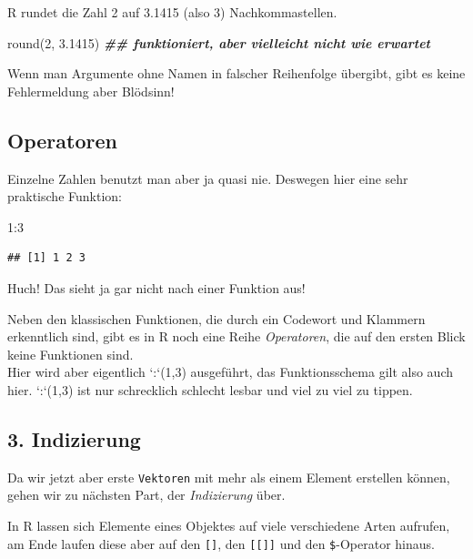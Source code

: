\documentclass[
]{book}
\newenvironment{Shaded}{\begin{snugshade}}{\end{snugshade}}
\newcommand{\DecValTok}[1]{\textcolor[rgb]{0.00,0.00,0.81}{#1}}
\newcommand{\DocumentationTok}[1]{\textcolor[rgb]{0.56,0.35,0.01}{\textbf{\textit{#1}}}}
\newcommand{\FloatTok}[1]{\textcolor[rgb]{0.00,0.00,0.81}{#1}}
\newcommand{\FunctionTok}[1]{\textcolor[rgb]{0.00,0.00,0.00}{#1}}
\newcommand{\NormalTok}[1]{#1}
\newcommand{\SpecialCharTok}[1]{\textcolor[rgb]{0.00,0.00,0.00}{#1}}
\begin{document}
R rundet die Zahl 2 auf 3.1415 (also 3) Nachkommastellen.

\begin{Shaded}
\begin{Highlighting}[]
\FunctionTok{round}\NormalTok{(}\DecValTok{2}\NormalTok{, }\FloatTok{3.1415}\NormalTok{) }\DocumentationTok{\#\# funktioniert, aber vielleicht nicht wie erwartet}
\end{Highlighting}
\end{Shaded}

Wenn man Argumente ohne Namen in falscher Reihenfolge übergibt, gibt es keine Fehlermeldung aber Blödsinn!

\hypertarget{operatoren}{%
\subsection{Operatoren}\label{operatoren}}

Einzelne Zahlen benutzt man aber ja quasi nie. Deswegen hier eine sehr praktische Funktion:

\begin{Shaded}
\begin{Highlighting}[]
\DecValTok{1}\SpecialCharTok{:}\DecValTok{3}
\end{Highlighting}
\end{Shaded}

\begin{verbatim}
## [1] 1 2 3
\end{verbatim}

Huch! Das sieht ja gar nicht nach einer Funktion aus!

Neben den klassischen Funktionen, die durch ein Codewort und Klammern erkenntlich sind, gibt es in R noch eine Reihe \emph{Operatoren}, die auf den ersten Blick keine Funktionen sind.\\
Hier wird aber eigentlich `:`(1,3) ausgeführt, das Funktionsschema gilt also auch hier. `:`(1,3) ist nur schrecklich schlecht lesbar und viel zu viel zu tippen.

\hypertarget{indizierung}{%
\subsection{3. Indizierung}\label{indizierung}}

Da wir jetzt aber erste \texttt{Vektoren} mit mehr als einem Element erstellen können, gehen wir zu nächsten Part, der \emph{Indizierung} über.

In R lassen sich Elemente eines Objektes auf viele verschiedene Arten aufrufen, am Ende laufen diese aber auf den \texttt{{[}{]}}, den \texttt{{[}{[}{]}{]}} und den \texttt{\$}-Operator hinaus.
\end{document}
